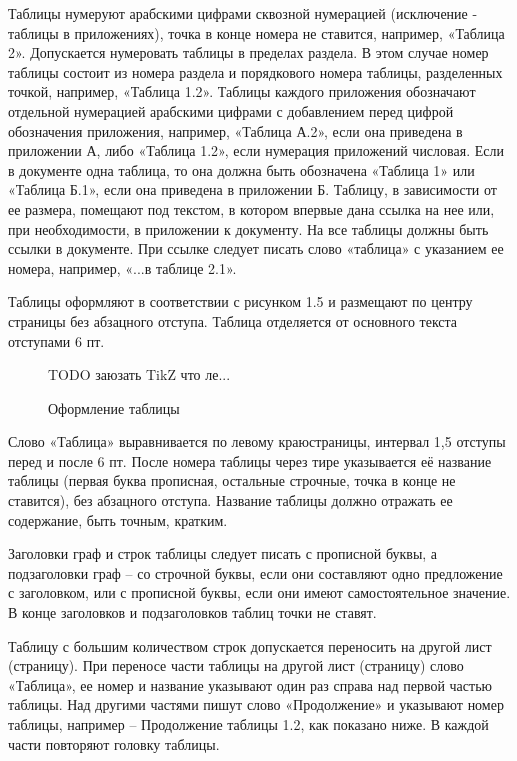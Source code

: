 Таблицы нумеруют арабскими цифрами сквозной нумерацией (исключение - таблицы в
приложениях), точка в конце номера не ставится, например, «Таблица 2». Допускается
нумеровать таблицы в пределах раздела. В этом случае номер таблицы состоит из номера
раздела и порядкового номера таблицы, разделенных точкой, например, «Таблица 1.2». Таблицы
каждого приложения обозначают отдельной нумерацией арабскими цифрами с добавлением
перед цифрой обозначения приложения, например, «Таблица А.2», если она приведена в
приложении А, либо «Таблица 1.2», если нумерация приложений числовая. Если в документе
одна таблица, то она должна быть обозначена «Таблица 1» или «Таблица Б.1», если она
приведена в приложении Б. Таблицу, в зависимости от ее размера, помещают под текстом, в
котором впервые дана ссылка на нее или, при необходимости, в приложении к документу. На
все таблицы должны быть ссылки в документе. При ссылке следует писать слово «таблица» с
указанием ее номера, например, «...в таблице 2.1».

Таблицы оформляют в соответствии с рисунком 1.5 и размещают по центру страницы без
абзацного отступа. Таблица отделяется от основного текста отступами 6 пт.

\begin{figure}[h]
	\begin{framed}
		\centerline{TODO заюзать TikZ что ле...}
	\end{framed}
	\caption{Оформление таблицы}
	\label{subsects}
\end{figure}

Слово «Таблица» выравнивается по левому краюстраницы, интервал 1,5 отступы перед и
после 6 пт. После номера таблицы через тире указывается её название таблицы (первая буква
прописная, остальные строчные, точка в конце не ставится), без абзацного отступа. Название
таблицы должно отражать ее содержание, быть точным, кратким.

Заголовки граф и строк таблицы следует писать с прописной буквы, а подзаголовки
граф – со строчной буквы, если они составляют одно предложение с заголовком, или с
прописной буквы, если они имеют самостоятельное значение. В конце заголовков и
подзаголовков таблиц точки не ставят.

Таблицу с большим количеством строк допускается переносить на другой лист
(страницу). При переносе части таблицы на другой лист (страницу) слово «Таблица», ее номер
и название указывают один раз справа над первой частью таблицы. Над другими частями пишут
слово «Продолжение» и указывают номер таблицы, например – Продолжение таблицы 1.2, как
показано ниже. В каждой части повторяют головку таблицы.


